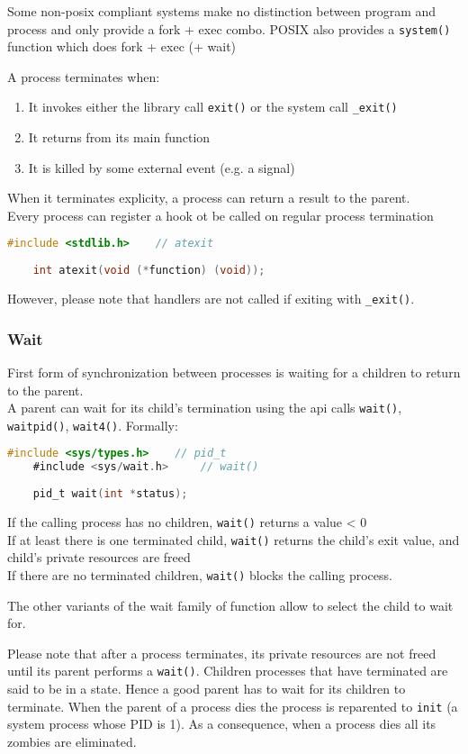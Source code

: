 Some non-posix compliant systems make no distinction between program and process and only provide a fork + exec combo. POSIX also provides a \texttt{system()} function which does fork + exec (+ wait)

A process terminates when:
\begin{enumerate}
    \item It invokes either the library call \texttt{exit()} or the system call \texttt{\_exit()}
    \item It returns from its main function
    \item It is killed by some external event (e.g. a signal)
\end{enumerate}

When it terminates explicity, a process can return a result to the parent.\\
Every process can register a hook ot be called on regular process termination 
\begin{lstlisting}[language=C]
    #include <stdlib.h>    // atexit
    
    int atexit(void (*function) (void));
\end{lstlisting}
However, please note that handlers are not called if exiting with \texttt{\_exit()}.

\subsubsection{Wait}
First form of synchronization between processes is waiting for a children to return to the parent.\\
A parent can wait for its child's termination using the api calls \texttt{wait()}, \texttt{waitpid()}, \texttt{wait4()}.
Formally:
\begin{lstlisting}[language=C]
    #include <sys/types.h>    // pid_t
    #include <sys/wait.h>     // wait()
    
    pid_t wait(int *status);
\end{lstlisting}
If the calling process has no children, \texttt{wait()} returns a value < 0\\
If at least there is one terminated child, \texttt{wait()} returns the child's exit value, and child's private resources are freed\\
If there are no terminated children, \texttt{wait()} blocks the calling process.

The other variants of the wait family of function allow to select the child to wait for.

Please note that after a process terminates, its private resources are not freed until its parent performs a \texttt{wait()}. Children processes that have terminated are said to be in a  state. Hence a good parent has to wait for its children to terminate.
When the parent of a process dies the process is reparented to \texttt{init} (a system process whose PID is 1). As a consequence, when a process dies all its zombies are eliminated.

